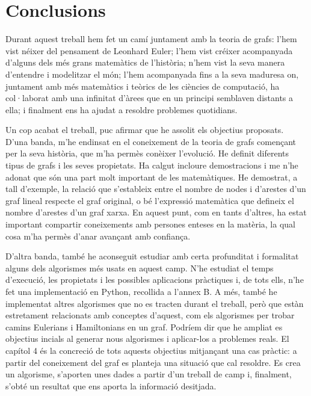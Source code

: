 \documentclass[a4, 12pt, catalan]{report}
\newcounter{propietat}[subsection]
\begin{document}
\section*{Conclusions}
Durant aquest treball hem fet un camí juntament amb la teoria de grafs: l'hem vist néixer del pensament de Leonhard Euler; l'hem vist créixer acompanyada d'alguns dels més grans matemàtics de l'història; n'hem vist la seva manera d'entendre i modelitzar el món; l'hem acompanyada fins a la seva maduresa on, juntament amb més matemàtics i teòrics de les ciències de computació, ha col·laborat amb una infinitat d'àrees que en un principi semblaven distants a ella; i finalment ens ha ajudat a resoldre problemes quotidians.

Un cop acabat el treball, puc afirmar que he assolit els objectius proposats. D'una banda, m'he endinsat en el coneixement de la teoria de grafs començant per la seva història, que m'ha permès conèixer l'evolució. He definit diferents tipus de grafs i les seves propietats. Ha calgut incloure demostracions i me n'he adonat que són una part molt important de les matemàtiques. He demostrat, a tall d'exemple, la relació que s'estableix entre el nombre de nodes i d'arestes d'un graf lineal respecte el graf original, o bé l'expressió matemàtica que defineix el nombre d'arestes d'un graf xarxa. En aquest punt, com en tants d'altres, ha estat important compartir coneixements amb persones enteses en la matèria, la qual cosa m'ha permès d'anar avançant amb confiança. 

D'altra banda, també he aconseguit estudiar amb certa profunditat i formalitat alguns dels algorismes més usats en aquest camp. N'he estudiat el temps d'execució, les propietats i les possibles aplicacions pràctiques i, de tots ells, n'he fet una implementació en Python, recollida a l'annex B. A més, també he implementat altres algorismes que no es tracten durant el treball, però que estàn estretament relacionats amb conceptes d'aquest, com els algorismes per trobar camins Eulerians i Hamiltonians en un graf. Podríem dir que he ampliat es objectius incials al generar nous algorismes i aplicar-los a problemes reals. 
El capítol 4 és la concreció de tots aquests objectius mitjançant una cas pràctic: a partir del coneixement del graf es planteja una situació que cal resoldre. Es crea un algorisme, s'aporten unes dades a partir d'un treball de camp i, finalment, s'obté un resultat que ens aporta la informació desitjada.
\end{document}
